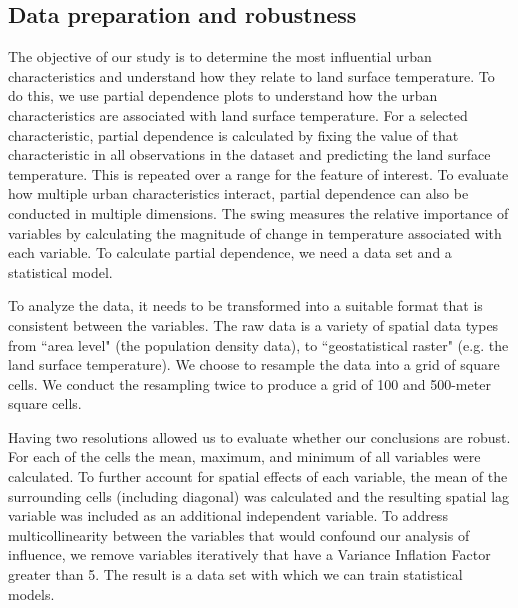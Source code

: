 \documentclass[review]{elsarticle}
\begin{document}
\subsection{Data preparation and robustness}

The objective of our study is to determine the most influential urban characteristics and understand how they relate to land surface temperature.
To do this, we use partial dependence plots to understand how the urban characteristics are associated with land surface temperature.
For a selected characteristic, partial dependence is calculated by fixing the value of that characteristic in all observations in the dataset and predicting the land surface temperature. 
This is repeated over a range for the feature of interest.
To evaluate how multiple urban characteristics interact, partial dependence can also be conducted in multiple dimensions.
The swing \cite{Shortridge2015-ub} measures the relative importance of variables by calculating the magnitude of change in temperature associated with each variable.
To calculate partial dependence, we need a data set and a statistical model.

To analyze the data, it needs to be transformed into a suitable format that is consistent between the variables.
The raw data is a variety of spatial data types from ``area level" (the population density data), to ``geostatistical raster" (e.g. the land surface temperature).
We choose to resample the data into a grid of square cells.
We conduct the resampling twice to produce a grid of 100 and 500-meter square cells. 

Having two resolutions allowed us to evaluate whether our conclusions are robust.
For each of the cells the mean, maximum, and minimum of all variables were calculated. 
To further account for spatial effects of each variable, the mean of the surrounding cells (including diagonal) was calculated and the resulting spatial lag variable was included as an additional independent variable. 
To address multicollinearity between the variables that would confound our analysis of influence, we remove variables iteratively that have a Variance Inflation Factor greater than 5.
The result is a data set with which we can train statistical models.
\end{document}
